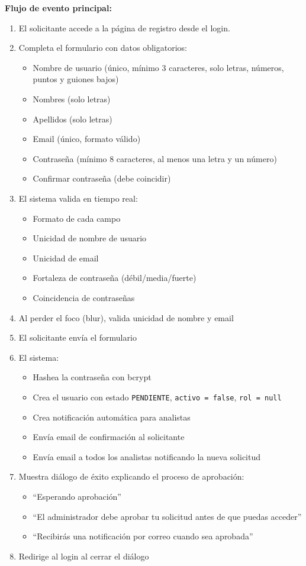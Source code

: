 \vspace{0.5em}
\noindent\textbf{Flujo de evento principal:}
\begin{enumerate}[nosep]
    \item El solicitante accede a la página de registro desde el login.
    \item Completa el formulario con datos obligatorios:
    \begin{itemize}[nosep]
        \item Nombre de usuario (único, mínimo 3 caracteres, solo letras, números, puntos y guiones bajos)
        \item Nombres (solo letras)
        \item Apellidos (solo letras)
        \item Email (único, formato válido)
        \item Contraseña (mínimo 8 caracteres, al menos una letra y un número)
        \item Confirmar contraseña (debe coincidir)
    \end{itemize}
    \item El sistema valida en tiempo real:
    \begin{itemize}[nosep]
        \item Formato de cada campo
        \item Unicidad de nombre de usuario
        \item Unicidad de email
        \item Fortaleza de contraseña (débil/media/fuerte)
        \item Coincidencia de contraseñas
    \end{itemize}
    \item Al perder el foco (blur), valida unicidad de nombre y email
    \item El solicitante envía el formulario
    \item El sistema:
    \begin{itemize}[nosep]
        \item Hashea la contraseña con bcrypt
        \item Crea el usuario con estado \texttt{PENDIENTE}, \texttt{activo = false}, \texttt{rol = null}
        \item Crea notificación automática para analistas
        \item Envía email de confirmación al solicitante
        \item Envía email a todos los analistas notificando la nueva solicitud
    \end{itemize}
    \item Muestra diálogo de éxito explicando el proceso de aprobación:
    \begin{itemize}[nosep]
        \item ``Esperando aprobación''
        \item ``El administrador debe aprobar tu solicitud antes de que puedas acceder''
        \item ``Recibirás una notificación por correo cuando sea aprobada''
    \end{itemize}
    \item Redirige al login al cerrar el diálogo
\end{enumerate}

